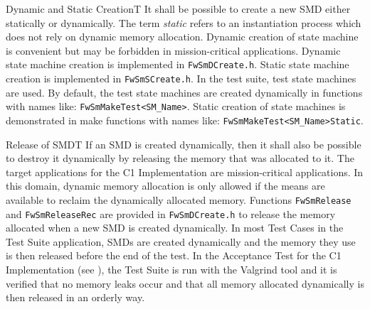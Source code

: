 \documentclass[a4paper,10pt]{article}
\newenvironment{fw_req}[6]
{\addtocounter{subsubsection}{1}
	\hspace{0.2cm}\textbf{FW-\arabic{section}.\arabic{subsection}.\arabic{subsubsection}/#2
	\hspace{0.8cm} #1}
	\vspace{-10pt}
\begin{longtable}{p{2.7cm}P{8.5cm}}
\hline
\textsc{Requirement} & #3 \\
\textsc{Justification} & #4 \\
\textsc{Implementation} & #5  \\ 
\textsc{Verification} & #6  \\
\hline
}
{\end{longtable}}
\newenvironment{fw_req_note}[7]
{\addtocounter{subsubsection}{1}
	\hspace{0.2cm}\textbf{FW-\arabic{section}.\arabic{subsection}.\arabic{subsubsection}/#2
	\hspace{0.8cm} #1}
	\vspace{-10pt}
\begin{longtable}{p{2.7cm}P{8.5cm}}
\hline
\textsc{Requirement} & #3 \\
\textsc{Note} & #4 \\
\textsc{Justification} & #5 \\
\textsc{Implementation} & #6  \\ 
\textsc{Verification} & #7  \\
\hline
}
{\end{longtable}}
\begin{document}
\begin{fw_req_note}{Dynamic and Static Creation}{T}
{ It shall be possible to create a new SMD either statically or dynamically.}
{The term \emph{static} refers to an instantiation process which does not rely on dynamic memory
allocation.}
{Dynamic creation of state machine is convenient but may be forbidden in mission-critical applications.}
{Dynamic state machine creation is implemented in \texttt{FwSmDCreate.h}. Static state machine 
creation is implemented in \texttt{FwSmSCreate.h}.} 
{In the test suite, test state machines are used. By default, the test state machines are created dynamically in functions with names like: \texttt{FwSmMakeTest<SM\_Name>}. 
Static creation of state machines is demonstrated in make functions with names like: \texttt{FwSmMakeTest<SM\_Name>Static}.}
\end{fw_req_note}


\begin{fw_req}{Release of SMD}{T}
{If an SMD is created dynamically, then it shall also be possible to destroy it dynamically by releasing the memory 
that was allocated to it.}
{The target applications for the C1 Implementation are mission-critical applications. In this domain, dynamic 
memory allocation is only allowed if the means are available to reclaim the dynamically allocated memory.}
{Functions \texttt{FwSmRelease} and \texttt{FwSmReleaseRec} are provided in \texttt{FwSmDCreate.h} to release 
the memory allocated when a new SMD is created dynamically.} 
{In most Test Cases in the  Test Suite application, SMDs are created dynamically and the memory they use is then released before the end of the test. 
In the Acceptance Test for the C1 Implementation (see \cite{ref:um}), the Test Suite is run 
with the Valgrind tool and it is verified that no memory leaks occur and 
that all memory allocated dynamically is then released in an orderly way.}
\end{fw_req}
\end{document}
